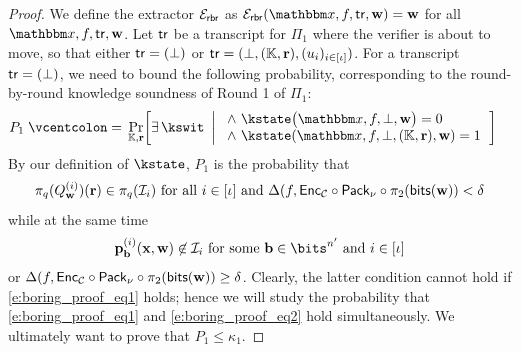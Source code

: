 \documentclass[11pt,letterpaper,usenames,dvipsnames]{article}
\begin{document}
\begin{proof}
 We define the extractor  $\mathcal{E}_{\mathsf{rbr}}$ as $\cE_{\mathsf{rbr}}(\inp,f,\tr,\ww)=\ww$ for all $\inp,f,\tr,\ww$. Let $\mathsf{tr}$ be a transcript for $\Pi_1$ where the verifier is about to move, so that either $\mathsf{tr}=(\bot)$ or $\mathsf{tr}=(\bot, (\mathbb{K},\mathbf{r}), (u_i)_{i\in[\iota]})$. For a transcript $\mathsf{tr}=(\bot)$, we need to bound the following probability, corresponding to the round-by-round knowledge soundness of Round 1 of $\Pi_1$:
%
\begin{align*}
  P_1\defeq &\Pr_{\KK,\rr}\!\left[
  \exists\,\kswit \ \left| \ \begin{array}{l}
  \wedge\ \kstate\bigl(\inp,f,\bot,\ww\bigr)=0\\
  \wedge\ \kstate(\inp,f, \bot,(\KK,\rr),\ww)=1
  \end{array}
  \right.\right] 
\end{align*}
% 
By our definition of $\kstate$, $P_1$ is the probability that 
%
\begin{equation}\label{e:boring_proof_eq1}\pi_q(Q_{\mathbf{w}}^{(i)})(\mathbf{r}) \in \pi_q(\mathcal{I}_i) \text{ for all } i\in [\iota] \text{ and } \Delta(f, \mathsf{Enc}_{\mathcal{C}}\circ \mathsf{Pack}_\nu \circ \pi_2(\mathsf{bits}(\mathbf{w}))<\delta
\end{equation} while at the same time \begin{equation}\label{e:boring_proof_eq2}\pp_\bb^{(i)}(\xx,\ww)\not\in \ideal_i \text{ for some } \bb\in \bits^{n'} \text{ and } i\in [\iota]\end{equation} or $\Delta(f, \mathsf{Enc}_{\mathcal{C}}\circ \mathsf{Pack}_\nu \circ \pi_2(\mathsf{bits}(\mathbf{w}))\geq\delta$. Clearly, the latter condition cannot hold if \eqref{e:boring_proof_eq1} holds; hence we will study the probability  that \eqref{e:boring_proof_eq1} and \eqref{e:boring_proof_eq2} hold simultaneously.  We ultimately want to prove that $P_1 \leq \kappa_1$.


\end{proof}
\end{document}
